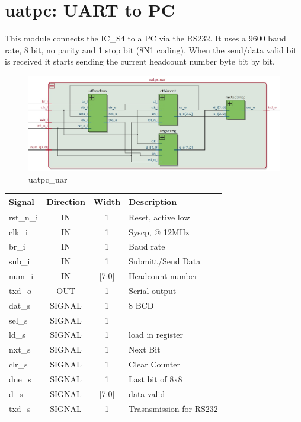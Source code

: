 \documentclass[12pt,a4 paper] {report}
\begin{document}
\section{uatpc: UART to PC}
This module connects the IC\_S4 to a PC via the RS232. It uses a 9600 baud rate, 8 bit, no parity and 1 stop bit (8N1 coding). When 
the send/data valid bit is received it starts sending the current headcount number byte bit by bit.
\begin{figure}[h]
	\centering	
	\includegraphics[scale=0.3]{../png/uatpc_uar.png}
	\caption{uatpc\_uar}
\end{figure}
\begin{center}
	\begin{tabular}{ | p{2cm} | c | c | p{5cm} |}
		\hline
		\textbf{Signal} & \textbf{Direction} & \textbf{Width} & \textbf{Description} \\
		\hline
		\hline
  	rst\_n\_i & IN & 1 & Reset, active low\\
  	\hline
		clk\_i & IN & 1 & Syscp, @ 12MHz \\
		\hline
		br\_i & IN & 1 & Baud rate \\
		\hline
		sub\_i & IN & 1 & Submitt/Send Data \\
		\hline
		num\_i & IN & [7:0] & Headcount number \\
		\hline
		txd\_o & OUT & 1 & Serial output \\
		\hline
		\hline
		dat\_s & SIGNAL & 1 & 8 BCD \\
		\hline	
		sel\_s & SIGNAL & 1 & \\
		\hline 
		ld\_s & SIGNAL & 1 & load in register\\
		\hline
		nxt\_s & SIGNAL & 1 & Next Bit \\
		\hline
		clr\_s & SIGNAL & 1 &  Clear Counter\\
		\hline
		dne\_s & SIGNAL & 1 & Last bit of 8x8 \\
		\hline
		d\_s & SIGNAL & [7:0] & data valid \\
		\hline
		txd\_s & SIGNAL & 1 & Trasnsmission for RS232 \\
		\hline
	\end{tabular}
\end{center}
\newpage
\end{document}
